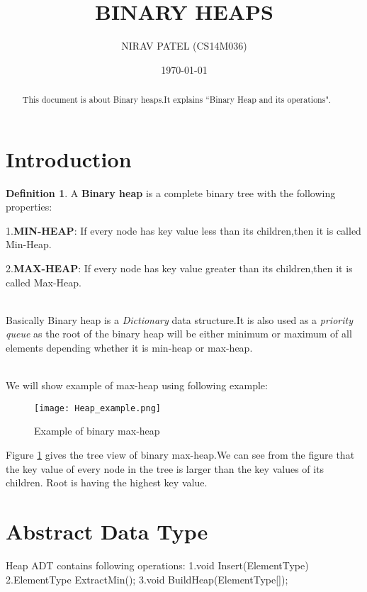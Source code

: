 \documentclass[11pt,a4paper]{amsart}
\theoremstyle{plain}
\numberwithin{equation}{section}
\theoremstyle{definition}
\newtheorem{defn}{Definition}[section]
\begin{document}
\title{BINARY HEAPS}
\author{NIRAV PATEL (CS14M036)}


\date{\today}


\begin{abstract}
This document is about Binary heaps.It explains ``Binary Heap and its operations".
\end{abstract}

\maketitle

\section{Introduction}

\begin{defn}
A \textbf{Binary heap} is a complete binary tree with the following properties:

1.\textbf{MIN-HEAP}: If every node has key value less than its children,then it is called Min-Heap.

2.\textbf{MAX-HEAP}: If every node has key value greater than its children,then it is called Max-Heap.

\end{defn}

\noindent \\Basically Binary heap is a \emph{Dictionary} data structure.It is also used as a \emph{priority queue} as the root of the binary heap will be either minimum or maximum of all elements depending whether it is min-heap or max-heap.

\noindent \\We will show example of max-heap using following example:

\begin{figure}[h] \label{fig:heap_example}
	\texttt{[image: Heap\_example.png]}
	\caption{Example of binary max-heap}
\end{figure}


\noindent Figure \ref{fig:heap_example} gives the tree view of binary max-heap.We can see from the figure that the key value of every node in the tree is larger than the key values of its children.
Root is having the highest key value.

\section{Abstract Data Type}
Heap ADT contains following operations:
1.void Insert(ElementType)
2.ElementType ExtractMin();
3.void BuildHeap(ElementType[]);
\end{document}
